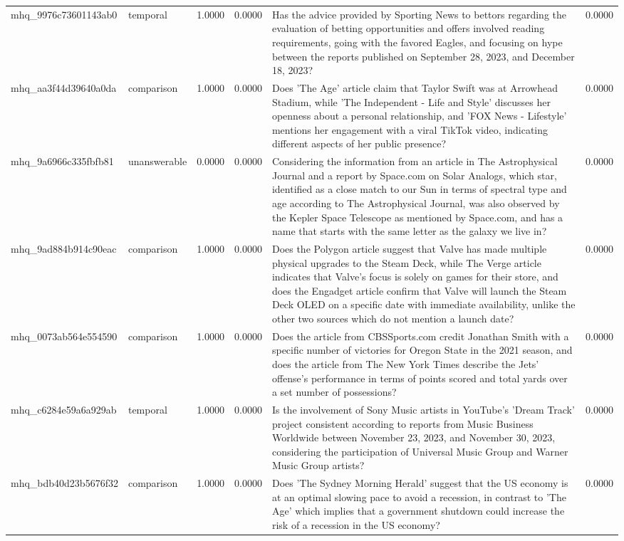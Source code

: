 \begin{tabular}{llrrlr}
mhq_9976c73601143ab0 & temporal & 1.0000 & 0.0000 & Has the advice provided by Sporting News to bettors regarding the evaluation of betting opportunities and offers involved reading requirements, going with the favored Eagles, and focusing on hype between the reports published on September 28, 2023, and December 18, 2023? & 0.0000 \\
mhq_aa3f44d39640a0da & comparison & 1.0000 & 0.0000 & Does 'The Age' article claim that Taylor Swift was at Arrowhead Stadium, while 'The Independent - Life and Style' discusses her openness about a personal relationship, and 'FOX News - Lifestyle' mentions her engagement with a viral TikTok video, indicating different aspects of her public presence? & 0.0000 \\
mhq_9a6966c335fbfb81 & unanswerable & 0.0000 & 0.0000 & Considering the information from an article in The Astrophysical Journal and a report by Space.com on Solar Analogs, which star, identified as a close match to our Sun in terms of spectral type and age according to The Astrophysical Journal, was also observed by the Kepler Space Telescope as mentioned by Space.com, and has a name that starts with the same letter as the galaxy we live in? & 0.0000 \\
mhq_9ad884b914c90eac & comparison & 1.0000 & 0.0000 & Does the Polygon article suggest that Valve has made multiple physical upgrades to the Steam Deck, while The Verge article indicates that Valve's focus is solely on games for their store, and does the Engadget article confirm that Valve will launch the Steam Deck OLED on a specific date with immediate availability, unlike the other two sources which do not mention a launch date? & 0.0000 \\
mhq_0073ab564e554590 & comparison & 1.0000 & 0.0000 & Does the article from CBSSports.com credit Jonathan Smith with a specific number of victories for Oregon State in the 2021 season, and does the article from The New York Times describe the Jets' offense's performance in terms of points scored and total yards over a set number of possessions? & 0.0000 \\
mhq_c6284e59a6a929ab & temporal & 1.0000 & 0.0000 & Is the involvement of Sony Music artists in YouTube's 'Dream Track' project consistent according to reports from Music Business Worldwide between November 23, 2023, and November 30, 2023, considering the participation of Universal Music Group and Warner Music Group artists? & 0.0000 \\
mhq_bdb40d23b5676f32 & comparison & 1.0000 & 0.0000 & Does 'The Sydney Morning Herald' suggest that the US economy is at an optimal slowing pace to avoid a recession, in contrast to 'The Age' which implies that a government shutdown could increase the risk of a recession in the US economy? & 0.0000 \\

\end{tabular}
